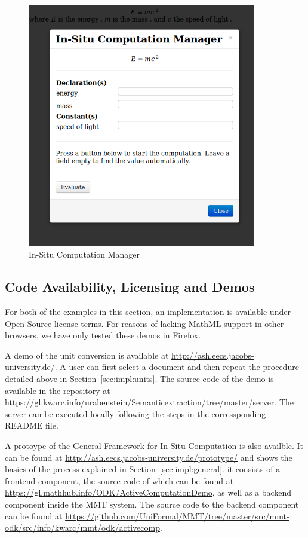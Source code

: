   \begin{figure}[ht]\centering
    \includegraphics[width=10cm]{screenshots/compman}
    \caption{In-Situ Computation Manager}\label{fig:compman}
  \end{figure}

\subsection{Code Availability, Licensing and Demos}

For both of the examples in this section, an implementation is available under Open Source license terms.
For reasons of lacking MathML support in other browsers, we have only tested these demos in Firefox.

A demo of the unit conversion is available at \url{http://ash.eecs.jacobs-university.de/}.
A user can first select a document and then repeat the procedure detailed above in Section~\ref{sec:impl:units}.
The source code of the demo is available in the repository at \url{https://gl.kwarc.info/urabenstein/Semanticextraction/tree/master/server}.
The server can be executed locally following the steps in the corressponding README file.

A protoype of the General Framework for In-Situ Computation is also availble.
It can be found at \url{http://ash.eecs.jacobs-university.de/prototype/} and shows the basics of the process explained in Section~\ref{sec:impl:general}.
it consists of a frontend component, the source code of which can be found at \url{https://gl.mathhub.info/ODK/ActiveComputationDemo}, as well as a backend component inside the MMT system.
The source code to the backend component can be found at \url{https://github.com/UniFormal/MMT/tree/master/src/mmt-odk/src/info/kwarc/mmt/odk/activecomp}.

